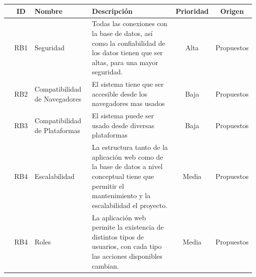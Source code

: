 \documentclass[11pt, fleqn]{article}                             %
\begin{document}
    \begin{tabular}{r ||c |m{7em} | m{15em} |c |c }
       &  ID & Nombre & Descripción & Prioridad & Origen \\ [0.5ex] 
       \hline\hline
      
        & RB1   & Seguridad                         &
        Todas las conexiones con la base de datos, así como la confiabilidad de los datos
        tienen que ser altas, para una mayor seguridad.
        & Alta  & Propuestos\\

        & RB2   & Compatibilidad de Navegadores     &
        El sistema tiene que ser accesible desde los navegadores mas usados
        & Baja  & Propuestos\\

        & RB3   & Compatibilidad de Plataformas     &
        El sistema puede ser usado desde diversas plataformas
        & Baja  & Propuestos\\

        & RB4   & Escalabilidad                     &
        La estructura tanto de la aplicación web como de la base de datos a nivel conceptual tiene
        que permitir el mantenimiento y la escalabilidad el proyecto.
        & Media  & Propuestos\\

        & RB4   & Roles                             &
        La aplicación web permite la existencia de distintos tipos de usuarios, con cada tipo
        las acciones disponibles cambian.
        & Media  & Propuestos\\

    \end{tabular}
\end{document}
